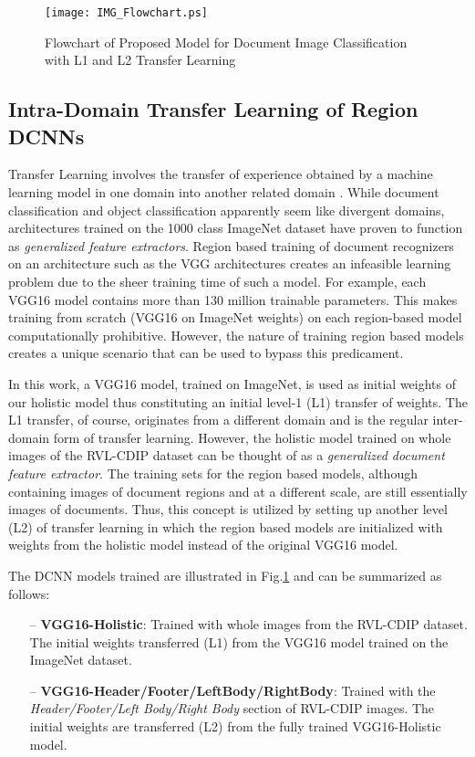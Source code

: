 \documentclass[10pt,conference,a4paper]{IEEEtran}
\begin{document}
\begin{figure}[t]
	\centering
	\texttt{[image: IMG\_Flowchart.ps]}
	\caption{Flowchart of Proposed Model for Document Image Classification with L1 and L2 Transfer Learning} \label{fig:flowchart}
\end{figure}

\subsection{Intra-Domain Transfer Learning of Region DCNNs}
Transfer Learning involves the transfer of experience obtained by a machine learning model in one domain into another related domain \cite{Pan2010}. While document classification and object classification apparently seem like divergent domains, architectures trained on the 1000 class ImageNet dataset have proven to function as \textit{generalized feature extractors}. Region based training of document recognizers on an architecture such as the VGG architectures creates an infeasible learning problem due to the sheer training time of such a model. For example, each VGG16 model contains more than 130 million trainable parameters. This makes training from scratch (VGG16 on ImageNet weights) on each region-based model computationally prohibitive. However, the nature of training region based models creates a unique scenario that can be used to bypass this predicament.

In this work, a VGG16 model, trained on ImageNet, is used as initial weights of our holistic model thus constituting an initial level-1 (L1) transfer of weights. The L1 transfer, of course, originates from a different domain and is the regular inter-domain form of transfer learning. However, the holistic model trained on whole images of the RVL-CDIP dataset can be thought of as a \textit{generalized document feature extractor}. The training sets for the region based models, although containing images of document regions and at a different scale, are still essentially images of documents. Thus, this concept is utilized by setting up another level (L2) of transfer learning in which the region based models are initialized with weights from the holistic model instead of the original VGG16 model.

The DCNN models trained are illustrated in Fig.\ref{fig:flowchart} and can be summarized as follows:

\begin{itemize}
\item[--] \textbf{VGG16-Holistic}: Trained with whole images from the RVL-CDIP dataset. The initial weights transferred (L1) from the VGG16 model trained on the ImageNet dataset.
 	
\item[--] \textbf{VGG16-Header/Footer/LeftBody/RightBody}: Trained with the \textit{Header/Footer/Left Body/Right Body} section of RVL-CDIP images. The initial weights are transferred (L2) from the fully trained VGG16-Holistic model.
\end{itemize}
\end{document}
